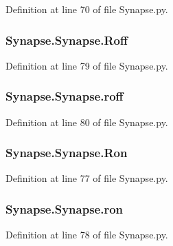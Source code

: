 Definition at line 70 of file Synapse.\-py.

\hypertarget{class_synapse_1_1_synapse_ae67ffbbd23cd9c56f20bda9e8e040663}{
\subsubsection[{Roff}]{\setlength{\rightskip}{0pt plus 5cm}Synapse.\-Synapse.\-Roff}}\label{class_synapse_1_1_synapse_ae67ffbbd23cd9c56f20bda9e8e040663}


Definition at line 79 of file Synapse.\-py.

\hypertarget{class_synapse_1_1_synapse_a9a8d45c76378fae50d7ed2af29602aa8}{
\subsubsection[{roff}]{\setlength{\rightskip}{0pt plus 5cm}Synapse.\-Synapse.\-roff}}\label{class_synapse_1_1_synapse_a9a8d45c76378fae50d7ed2af29602aa8}


Definition at line 80 of file Synapse.\-py.

\hypertarget{class_synapse_1_1_synapse_ae759c51a7196995510fe3eb086050c76}{
\subsubsection[{Ron}]{\setlength{\rightskip}{0pt plus 5cm}Synapse.\-Synapse.\-Ron}}\label{class_synapse_1_1_synapse_ae759c51a7196995510fe3eb086050c76}


Definition at line 77 of file Synapse.\-py.

\hypertarget{class_synapse_1_1_synapse_a2e4a3427e071a311ac52341ad67f90c6}{
\subsubsection[{ron}]{\setlength{\rightskip}{0pt plus 5cm}Synapse.\-Synapse.\-ron}}\label{class_synapse_1_1_synapse_a2e4a3427e071a311ac52341ad67f90c6}


Definition at line 78 of file Synapse.\-py.

